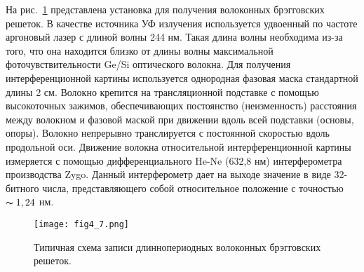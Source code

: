 На рис.~\ref{fig4.7} представлена установка для получения волоконных брэгговских решеток. В качестве источника УФ излучения используется удвоенный по частоте аргоновый лазер с длиной волны 244 нм. Такая длина волны необходима из-за того, что она находится близко от длины волны максимальной фоточувствительности Ge/Si оптического волокна. Для получения интерференционной картины используется однородная фазовая маска стандартной длины 2 см. Волокно крепится на трансляционной подставке с помощью высокоточных зажимов, обеспечивающих постоянство (неизменность) расстояния между волокном и фазовой маской при движении вдоль всей подставки (основы, опоры). Волокно непрерывно транслируется с постоянной скоростью вдоль продольной оси. Движение волокна относительной интерференционной картины измеряется с помощью дифференциального He-Ne (632,8 нм) интерферометра производства Zygo. Данный интерферометр дает на выходе значение в виде 32-битного числа, представляющего собой относительное положение с точностью $\thicksim 1,24$ нм.
\begin{figure}
\centering
\texttt{[image: fig4\_7.png]}
\caption{Типичная схема записи длиннопериодных волоконных брэгговских решеток.}\label{fig4.7}
\end{figure}
